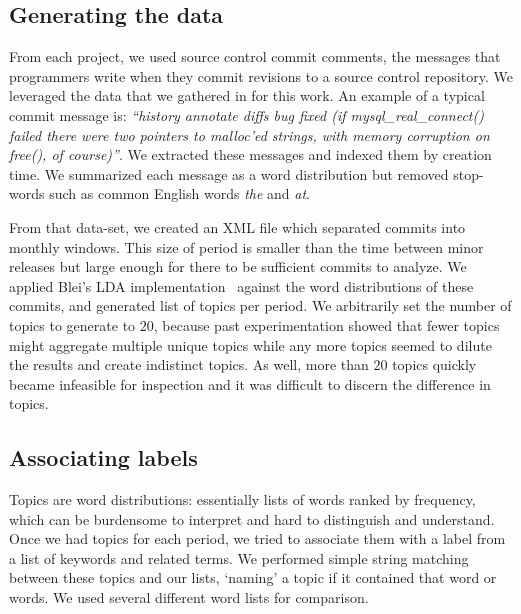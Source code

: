\documentclass{acm_proc_article-sp}
\begin{document}
\subsection{Generating the data}
From each project, we used source control commit comments, the messages that programmers write when they commit revisions to a source control repository. We leveraged the data that we gathered in \cite{Hindle09ICSM} for this work. An example of a typical commit message is: \textit{``history annotate diffs bug fixed (if mysql\_real\_connect() failed there were two pointers to malloc'ed strings, with memory corruption on free(), of course)''}. We extracted these messages and indexed them by creation time. We summarized each message as a word distribution but removed stop-words such as common English words \emph{the} and \emph{at}.

From that data-set, we created an XML file which separated commits into
monthly windows. This size of period is smaller than the time between minor releases but large enough for there to be sufficient commits to analyze. We applied Blei's LDA implementation~\cite{Blei2003} against the word distributions of these commits, and generated list of topics per period. 
We arbitrarily set the number of topics to generate to $20$, because past experimentation showed that fewer topics might aggregate multiple unique topics while any more topics seemed to dilute the results and create indistinct topics. As well, more than $20$ topics quickly became infeasible for inspection and it was difficult to discern the difference in topics.

\subsection{Associating labels}

Topics are word distributions: essentially lists of words ranked by frequency, which can be burdensome to interpret and hard to distinguish and understand.
Once we had topics for each period, we tried to associate them with a label from a list of keywords and related terms. We performed simple string matching between these topics and our lists, `naming' a topic if it contained that word or words. We used several different word lists for comparison. 
\end{document}
